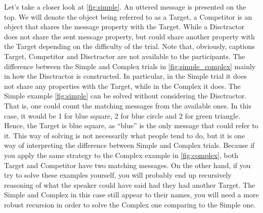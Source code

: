 Let's take a closer look at \autoref{fig:simple}. An uttered message is presented on the top. We will denote the object being referred to as a Target, a Competitor is an object that shares the message property with the Target. While a Disctractor does not share the sent message property, but could share another property with the Target depending on the difficulty of the trial. Note that, obviously, captions Target, Competitor and Disctractor are not available to the participants. The difference between the Simple and Complex trials in \autoref{fig:simple_complex} mainly in how the Disctractor is constructed. In particular, in the Simple trial it does not share any properties with the Target, while in the Complex it does. The Simple example \autoref{fig:simple} can be solved without considering the Disctractor. That is, one could count the matching messages from the available ones. In this case, it would be 1 for blue square, 2 for blue circle and 2 for green triangle. Hence, the Target is blue square, as ``blue'' is the only message that could refer to it. This way of solving is not necessarily what people tend to do, but it is one way of interpreting the difference between Simple and Complex trials. Because if you apply the same strategy to the Complex example in \autoref{fig:complex}, both Target and Competitor have two matching messages. On the other hand, if you try to solve these examples yourself, you will probably end up recursively reasoning of what the speaker could have said had they had another Target. The Simple and Complex in this case still appear to their names, you will need a more robust recursion in order to solve the Complex one comparing to the Simple one.

